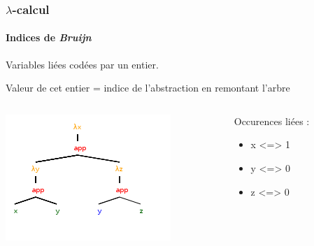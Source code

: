 \documentclass{beamer}
\begin{document}
\begin{frame}
\frametitle{$\lambda$-calcul}
\framesubtitle{Indices de \textit{Bruijn}}

Variables liées codées par un entier.

\medskip

Valeur de cet entier = indice de l'abstraction en remontant l'arbre

\bigskip

\begin{columns}
\begin{column}{5cm}
\includegraphics{lambda1.png}
\end{column}

\begin{column}{5cm}
Occurences liées :
\begin{itemize}
\item x <=> 1
\item y <=> 0
\item z <=> 0
\end{itemize}
\end{column}
\end{columns}


\end{frame}
\end{document}
